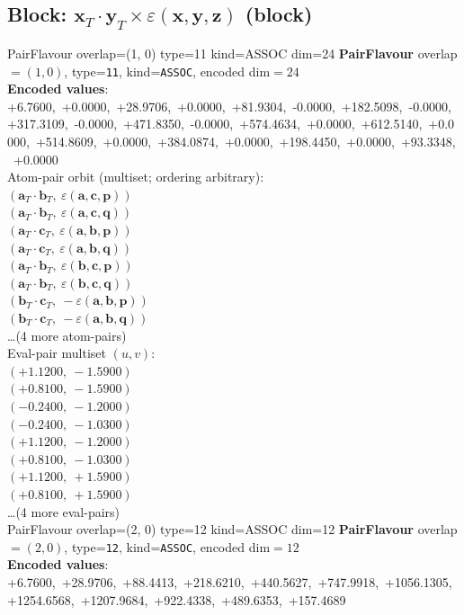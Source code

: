 \documentclass[a4paper,11pt]{article}
\newcommand{\fpbeomcfokjooi}[2]{\mathbf{#1}_T \cdot \mathbf{#2}_T}
\newcommand{\kblbmcpggoncpf}[3]{\varepsilon(\mathbf{#1},\mathbf{#2},\mathbf{#3})}
\begin{document}
\subsection{Block: $\fpbeomcfokjooi{x}{y} \times \kblbmcpggoncpf{x}{y}{z}$  (block)}
    PairFlavour  overlap=(1, 0)  type=11  kind=ASSOC  dim=24
\textbf{PairFlavour} overlap$=(1, 0)$, type=\texttt{11}, kind=\texttt{ASSOC}, encoded dim$=24$\\
\textbf{      Encoded values}: +6.7600,\ +0.0000,\ +28.9706,\ +0.0000,\ +81.9304,\ -0.0000,\ +182.5098,\ -0.0000,\ +317.3109,\ -0.0000,\ +471.8350,\ -0.0000,\ +574.4634,\ +0.0000,\ +612.5140,\ +0.0000,\ +514.8609,\ +0.0000,\ +384.0874,\ +0.0000,\ +198.4450,\ +0.0000,\ +93.3348,\ +0.0000\\
\quad Atom-pair orbit (multiset; ordering arbitrary):\\
$(\fpbeomcfokjooi{a}{b},\ \kblbmcpggoncpf{a}{c}{p})$\\
$(\fpbeomcfokjooi{a}{b},\ \kblbmcpggoncpf{a}{c}{q})$\\
$(\fpbeomcfokjooi{a}{c},\ \kblbmcpggoncpf{a}{b}{p})$\\
$(\fpbeomcfokjooi{a}{c},\ \kblbmcpggoncpf{a}{b}{q})$\\
$(\fpbeomcfokjooi{a}{b},\ \kblbmcpggoncpf{b}{c}{p})$\\
$(\fpbeomcfokjooi{a}{b},\ \kblbmcpggoncpf{b}{c}{q})$\\
$(\fpbeomcfokjooi{b}{c},\ -\kblbmcpggoncpf{a}{b}{p})$\\
$(\fpbeomcfokjooi{b}{c},\ -\kblbmcpggoncpf{a}{b}{q})$\\
\quad \ldots (4 more atom-pairs)\\
\quad Eval-pair multiset $(u, v)$:\\
$(+1.1200,\ -1.5900)$\\
$(+0.8100,\ -1.5900)$\\
$(-0.2400,\ -1.2000)$\\
$(-0.2400,\ -1.0300)$\\
$(+1.1200,\ -1.2000)$\\
$(+0.8100,\ -1.0300)$\\
$(+1.1200,\ +1.5900)$\\
$(+0.8100,\ +1.5900)$\\
\quad \ldots (4 more eval-pairs)\\
    PairFlavour  overlap=(2, 0)  type=12  kind=ASSOC  dim=12
\textbf{PairFlavour} overlap$=(2, 0)$, type=\texttt{12}, kind=\texttt{ASSOC}, encoded dim$=12$\\
\textbf{      Encoded values}: +6.7600,\ +28.9706,\ +88.4413,\ +218.6210,\ +440.5627,\ +747.9918,\ +1056.1305,\ +1254.6568,\ +1207.9684,\ +922.4338,\ +489.6353,\ +157.4689\\
\end{document}
